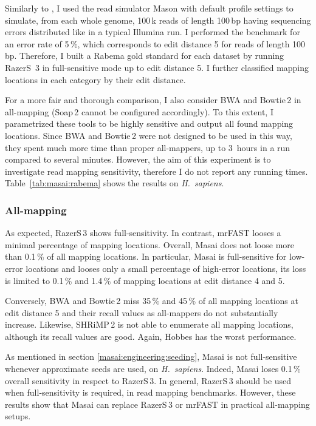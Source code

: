 Similarly to \citep{Langmead2012}, I used the read simulator Mason \citep{Holtgrewe2010} with default profile settings to simulate, from each whole genome, 100\,k reads of length 100\,bp having sequencing errors distributed like in a typical Illumina run.
I performed the benchmark for an error rate of 5\,\%, which corresponds to edit distance 5 for reads of length 100\,bp. Therefore, I built a Rabema gold standard for each dataset by running RazerS~3 in full-sensitive mode up to edit distance 5. I further classified mapping locations in each category by their edit distance.

For a more fair and thorough comparison, I also consider BWA and Bowtie\,2 in all-mapping (Soap\,2 cannot be configured accordingly).
To this extent, I parametrized these tools to be highly sensitive and output all found mapping locations.
Since BWA and Bowtie\,2 were not designed to be used in this way, they spent much more time than proper all-mappers, \ie up to 3~hours in a run compared to several minutes.
However, the aim of this experiment is to investigate read mapping sensitivity, therefore I do not report any running times.
Table~\ref{tab:masai:rabema} shows the results on \emph{H.~sapiens}.

\subsubsection{All-mapping}
As expected, RazerS\,3 shows full-sensitivity.
In contrast, mrFAST looses a minimal percentage of mapping locations.
Overall, Masai does not loose more than 0.1\,\% of all mapping locations.
In particular, Masai is full-sensitive for low-error locations and looses only a small percentage of high-error locations, \ie its loss is limited to 0.1\,\% and 1.4\,\% of mapping locations at edit distance 4 and 5.

Conversely, BWA and Bowtie\,2 miss 35\,\% and 45\,\% of all mapping locations at edit distance 5 and their recall values as all-mappers do not substantially increase.
Likewise, SHRiMP\,2 is not able to enumerate all mapping locations, although its recall values are good.
Again, Hobbes has the worst performance.

As mentioned in section \ref{masai:engineering:seeding}, Masai is not full-sensitive whenever approximate seeds are used, \eg on \emph{H.~sapiens}. Indeed, Masai loses 0.1\,\% overall sensitivity in respect to RazerS\,3.
In general, RazerS\,3 should be used when full-sensitivity is required, \ie in read mapping benchmarks.
However, these results show that Masai can replace RazerS\,3 or mrFAST in practical all-mapping setups.

